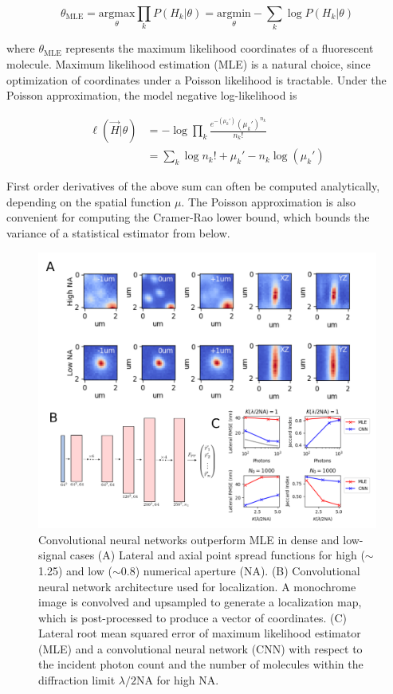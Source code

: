 \documentclass{ucetd}
\begin{document}
\begin{equation*}
\theta_{\mathrm{MLE}} = \underset{\theta}{\mathrm{argmax}}\prod_{k}P(H_{k}|\theta)= \underset{\theta}{\mathrm{argmin}}-\sum_{k}\log P(H_{k}|\theta)
\end{equation*}


where $\theta_{\mathrm{MLE}}$ represents the maximum likelihood coordinates of a fluorescent molecule. Maximum likelihood estimation (MLE) is a natural choice, since optimization of coordinates under a Poisson likelihood is tractable. Under the Poisson approximation, the model negative log-likelihood is

\begin{align}
\ell(\vec{H}|\theta) &= -\log \prod_{k} \frac{e^{-\left(\mu_{k}'\right)}\left(\mu_{k}'\right)^{n_{k}}}{n_{k}!}\\
&= \sum_{k}  \log n_{k}! + \mu_{k}' - n_{k}\log\left(\mu_{k}'\right)
\end{align}

First order derivatives of the above sum can often be computed analytically, depending on the spatial function $\mu$. The Poisson approximation is also convenient for computing the Cramer-Rao lower bound, which bounds the variance of a statistical estimator from below. 

\begin{figure}
\begin{center}
\includegraphics[width=16cm]{PSF2D.png}
\end{center}
\caption{Convolutional neural networks outperform MLE in dense and low-signal cases (A) Lateral and axial point spread functions for high ($\sim$1.25) and low ($\sim$0.8) numerical aperture (NA). (B) Convolutional neural network architecture used for localization. A monochrome image is convolved and upsampled to generate a localization map, which is post-processed to produce a vector of coordinates. (C) Lateral root mean squared error of maximum likelihood estimator (MLE) and a convolutional neural network (CNN) with respect to the incident photon count and the number of molecules within the diffraction limit $\lambda/2\mathrm{NA}$ for high NA. }
\end{figure}
\end{document}
